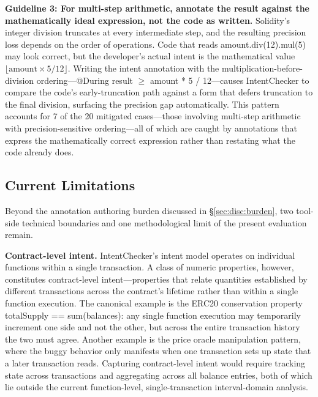 \documentclass[pdflatex,sn-basic]{sn-jnl}%
\theoremstyle{thmstyleone}%
\theoremstyle{thmstyletwo}%
\theoremstyle{thmstylethree}%
\begin{document}
\smallskip
\noindent\textbf{Guideline 3: For multi-step arithmetic, annotate the result against the mathematically ideal expression, not the code as written.}
Solidity's integer division truncates at every intermediate step, and the resulting precision loss depends on the order of operations.
Code that reads amount.div(12).mul(5) may look correct, but the developer's actual intent is the mathematical value $\lfloor\text{amount} \times 5 / 12\rfloor$.
Writing the intent annotation with the multiplication-before-division ordering---@During result $\geq$ amount * 5 / 12---causes IntentChecker to compare the code's early-truncation path against a form that defers truncation to the final division, surfacing the precision gap automatically.
This pattern accounts for 7 of the 20 mitigated cases---those involving multi-step arithmetic with precision-sensitive ordering---all of which are caught by annotations that express the mathematically correct expression rather than restating what the code already does.

\subsection{Current Limitations}\label{sec:disc:tech}

Beyond the annotation authoring burden discussed in §\ref{sec:disc:burden}, two tool-side technical boundaries and one methodological limit of the present evaluation remain.

\smallskip
\noindent\textbf{Contract-level intent.}
IntentChecker's intent model operates on individual functions within a single transaction.
A class of numeric properties, however, constitutes contract-level intent---properties that relate quantities established by different transactions across the contract's lifetime rather than within a single function execution.
The canonical example is the ERC20 conservation property totalSupply == sum(balances): any single function execution may temporarily increment one side and not the other, but across the entire transaction history the two must agree.
Another example is the price oracle manipulation pattern, where the buggy behavior only manifests when one transaction sets up state that a later transaction reads.
Capturing contract-level intent would require tracking state across transactions and aggregating across all balance entries, both of which lie outside the current function-level, single-transaction interval-domain analysis.
\end{document}
